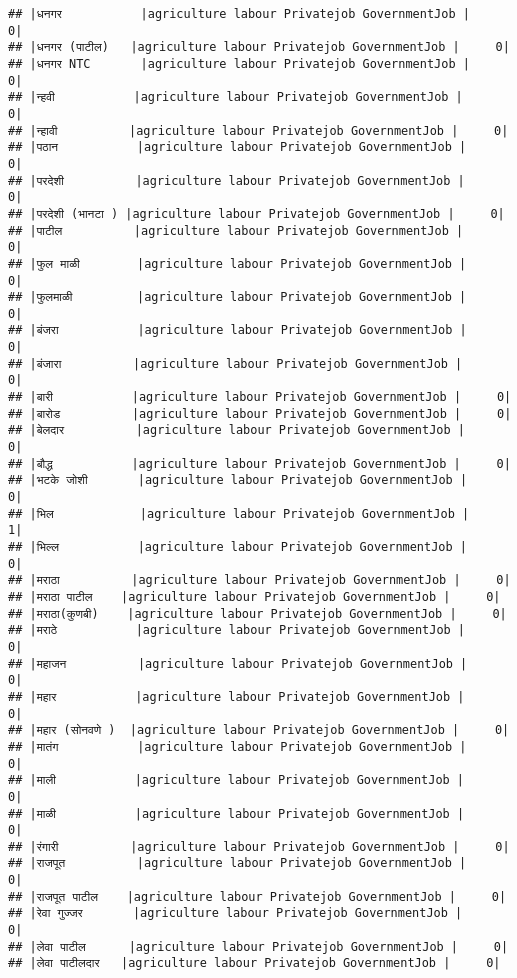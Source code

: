 \documentclass[
]{article}
\begin{document}
\begin{verbatim}
## |धनगर           |agriculture labour Privatejob GovernmentJob |     0|
## |धनगर (पाटील)   |agriculture labour Privatejob GovernmentJob |     0|
## |धनगर NTC       |agriculture labour Privatejob GovernmentJob |     0|
## |न्हवी           |agriculture labour Privatejob GovernmentJob |     0|
## |न्हावी          |agriculture labour Privatejob GovernmentJob |     0|
## |पठान           |agriculture labour Privatejob GovernmentJob |     0|
## |परदेशी          |agriculture labour Privatejob GovernmentJob |     0|
## |परदेशी (भानटा ) |agriculture labour Privatejob GovernmentJob |     0|
## |पाटील          |agriculture labour Privatejob GovernmentJob |     0|
## |फुल माळी        |agriculture labour Privatejob GovernmentJob |     0|
## |फुलमाळी         |agriculture labour Privatejob GovernmentJob |     0|
## |बंजरा           |agriculture labour Privatejob GovernmentJob |     0|
## |बंजारा          |agriculture labour Privatejob GovernmentJob |     0|
## |बारी           |agriculture labour Privatejob GovernmentJob |     0|
## |बारोड          |agriculture labour Privatejob GovernmentJob |     0|
## |बेलदार          |agriculture labour Privatejob GovernmentJob |     0|
## |बौद्ध           |agriculture labour Privatejob GovernmentJob |     0|
## |भटके जोशी       |agriculture labour Privatejob GovernmentJob |     0|
## |भिल            |agriculture labour Privatejob GovernmentJob |     1|
## |भिल्ल           |agriculture labour Privatejob GovernmentJob |     0|
## |मराठा          |agriculture labour Privatejob GovernmentJob |     0|
## |मराठा पाटील    |agriculture labour Privatejob GovernmentJob |     0|
## |मराठा(कुणबी)    |agriculture labour Privatejob GovernmentJob |     0|
## |मराठे           |agriculture labour Privatejob GovernmentJob |     0|
## |महाजन          |agriculture labour Privatejob GovernmentJob |     0|
## |महार           |agriculture labour Privatejob GovernmentJob |     0|
## |महार (सोनवणे )  |agriculture labour Privatejob GovernmentJob |     0|
## |मातंग           |agriculture labour Privatejob GovernmentJob |     0|
## |माली           |agriculture labour Privatejob GovernmentJob |     0|
## |माळी           |agriculture labour Privatejob GovernmentJob |     0|
## |रंगारी          |agriculture labour Privatejob GovernmentJob |     0|
## |राजपूत          |agriculture labour Privatejob GovernmentJob |     0|
## |राजपूत पाटील    |agriculture labour Privatejob GovernmentJob |     0|
## |रेवा गुज्जर       |agriculture labour Privatejob GovernmentJob |     0|
## |लेवा पाटील      |agriculture labour Privatejob GovernmentJob |     0|
## |लेवा पाटीलदार   |agriculture labour Privatejob GovernmentJob |     0|

\end{verbatim}
\end{document}
